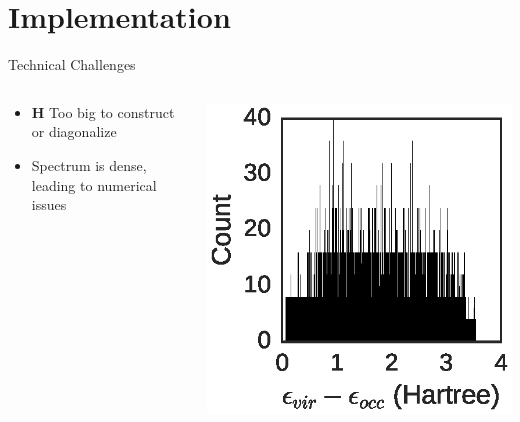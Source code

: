 \documentclass[10pt]{beamer}
\begin{document}
{{{{{{{{{\section{Implementation}

{%

\begin{frame}{Technical Challenges}
	\begin{columns}[c] %
		\begin{column}{.4\textwidth}
			\begin{itemize}
			  \item {$\mathbf{H}$ Too big to construct or diagonalize}
				\item {Spectrum is dense, leading to numerical issues}
			\end{itemize}
		\end{column}
		\hfill
		\begin{column}{0.6\textwidth}
		    \begin{overprint}
			    \includegraphics[width=\linewidth]{../figures/exchist.eps}
			\end{overprint}
		\end{column}
	\end{columns}
\end{frame}

}}}}}}}}}}
\end{document}
